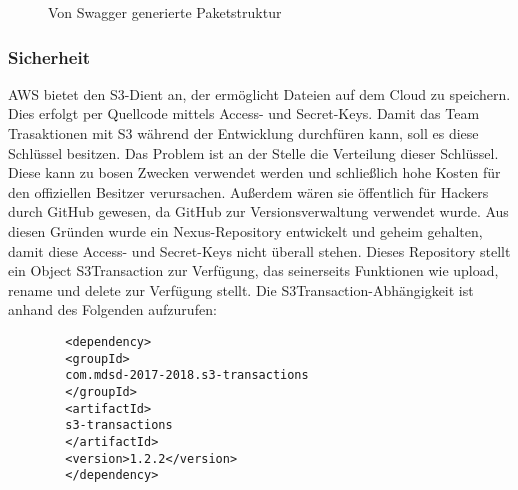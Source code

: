 \documentclass[a4paper,twoside]{article}
\begin{document}
	\begin{figure}[ht]
		\centering
		{}
		\caption{Von Swagger generierte Paketstruktur}
		\label{fig:von-swagger-generierte-paketstruktur}
	\end{figure}
	
	\subsubsection{Sicherheit}
	
	AWS bietet den S3-Dient an, der erm\"oglicht Dateien auf dem Cloud zu speichern. Dies erfolgt per Quellcode mittels Access- und Secret-Keys. Damit das Team Trasaktionen mit S3 w\"ahrend der Entwicklung durchf\"uren kann, soll es diese Schl\"ussel besitzen. Das Problem ist an der Stelle die Verteilung dieser Schl\"ussel. Diese kann zu bosen Zwecken verwendet werden und schlie\ss{}lich hohe Kosten f\"ur den offiziellen Besitzer verursachen. Au\ss{}erdem w\"aren sie \"offentlich f\"ur Hackers durch GitHub gewesen, da GitHub zur Versionsverwaltung verwendet wurde.
	Aus diesen Gr\"unden wurde ein Nexus-Repository entwickelt und geheim gehalten, damit diese Access- und Secret-Keys nicht \"uberall stehen. Dieses Repository stellt ein Object S3Transaction zur Verf\"ugung, das seinerseits Funktionen wie upload, rename und delete zur Verf\"ugung stellt. Die S3Transaction-Abh\"angigkeit ist anhand des Folgenden aufzurufen:
	
	\begin{small}
		\begin{verbatim}
		<dependency>
		<groupId>
		com.mdsd-2017-2018.s3-transactions
		</groupId>
		<artifactId>
		s3-transactions
		</artifactId>
		<version>1.2.2</version>
		</dependency>
		\end{verbatim}
	\end{small}
	
	\vfill
	
	{\small
		}
	
	\listoftables
	
	\listoffigures
\end{document}
